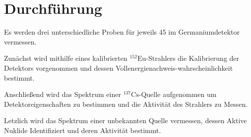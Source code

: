 \section{Durchführung}\label{sec:durchfuehrung}
Es werden drei unterschiedliche Proben für jeweils \SI{45}{\min} im Germaniumdetektor vermessen.

Zunächst wird mithilfe eines kalibrierten $^{152}\mathrm{Eu}$-Strahlers die Kalibrierung der Detektors vorgenommen und dessen Vollenergienachweis-wahrscheinlichkeit bestimmt.

Anschließend wird das Spektrum einer $^{137}\mathrm{Cs}$-Quelle aufgenommen um Detektoreigenschaften zu bestimmen und die Aktivität des Strahlers zu Messen.

Letzlich wird das Spektrum einer unbekannten Quelle vermessen, dessen Aktive Nuklide Identifiziert und deren Aktivität bestimmt.